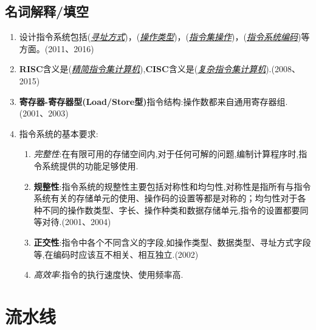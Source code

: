 \documentclass[a4paper]{ctexart}
\newcommand{\blank}[1]{(\emph{\underline{#1}})}
\begin{document}
\subsection{名词解释/填空}
\begin{enumerate}
  \item 设计指令系统包括\blank{寻址方式}，\blank{操作类型}，\blank{指令集操作}，\blank{指令系统编码}等方面。(2011、2016)
  \item \textbf{RISC}含义是\blank{精简指令集计算机},\textbf{CISC}含义是\blank{复杂指令集计算机}.(2008、2015)
  \item \textbf{寄存器-寄存器型(Load/Store型)}指令结构:操作数都来自通用寄存器组.(2001、2003)
  \item 指令系统的基本要求:
  \begin{enumerate}
    \item \emph{完整性}:在有限可用的存储空间内,对于任何可解的问题,编制计算程序时,指令系统提供的功能足够使用.
    \item \textbf{规整性}:指令系统的规整性主要包括对称性和均匀性,对称性是指所有与指令系统有关的存储单元的使用、操作码的设置等都是对称的；均匀性对于各种不同的操作数类型、字长、操作种类和数据存储单元,指令的设置都要同等对待.(2001、2004)
    \item \textbf{正交性}:指令中各个不同含义的字段,如操作类型、数据类型、寻址方式字段等,在编码时应该互不相关、相互独立.(2002)
    \item \emph{高效率}:指令的执行速度快、使用频率高.
  \end{enumerate}

\end{enumerate}

\newpage
\section{流水线}
\end{document}
